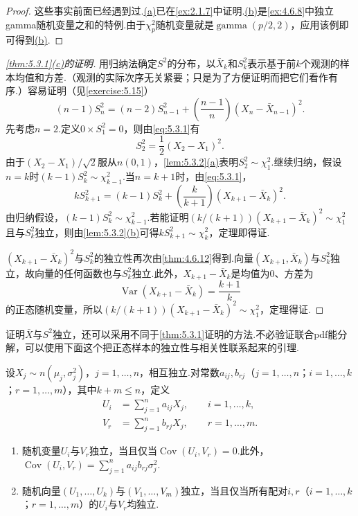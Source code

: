 \begin{proof}
这些事实前面已经遇到过.\hyperref[item:5.3.2a]{(a)}已在\autoref{ex:2.1.7}中证明.\hyperref[item:5.3.2b]{(b)}是\autoref{ex:4.6.8}中独立gamma随机变量之和的特例.由于$\chi_p^2$随机变量就是$\operatorname{gamma}(p/2,2)$，应用该例即可得到\hyperref[item:5.3.2b]{(b)}.
\end{proof}
\begin{proof}[{\autoref{thm:5.3.1}\hyperref[item:5.3.1c]{(c)}的证明}]
用归纳法确定$S^2$的分布，以$\bar X_k$和$S_k^2$表示基于前$k$个观测的样本均值和方差.（观测的实际次序无关紧要；只是为了方便证明而把它们看作有序.）容易证明（见\autoref{exercise:5.15}）
\begin{equation}\label{eq:5.3.1}
(n-1)S_n^2=(n-2)S_{n-1}^2+\left(\frac{n-1}{n}\right)(X_n-\bar X_{n-1})^2.
\end{equation}
先考虑$n=2$.定义$0\times S_1^2=0$，则由\eqref{eq:5.3.1}有
$$S_2^2=\frac12(X_2-X_1)^2.$$
由于$(X_2-X_1)/\sqrt2$服从$n(0,1)$，\autoref{lem:5.3.2}\hyperref[item:5.3.2a]{(a)}表明$S_2^2\sim\chi_1^2$.继续归纳，假设$n=k$时$(k-1)S_k^2\sim\chi_{k-1}^2$.当$n=k+1$时，由\eqref{eq:5.3.1}，
\begin{equation}\label{eq:5.3.2}
kS_{k+1}^2=(k-1)S_k^2+\left(\frac k{k+1}\right)(X_{k+1}-\bar X_k)^2.
\end{equation}
由归纳假设，$(k-1)S_k^2\sim\chi_{k-1}^2$.若能证明$(k/(k+1))(X_{k+1}-\bar X_k)^2\sim\chi_1^2$且与$S_k^2$独立，则由\autoref{lem:5.3.2}\hyperref[item:5.3.2b]{(b)}可得$kS_{k+1}^2\sim\chi_k^2$，定理即得证.

$(X_{k+1}-\bar X_k)^2$与$S_k^2$的独立性再次由\autoref{thm:4.6.12}得到.向量$(X_{k+1},\bar X_k)$与$S_k^2$独立，故向量的任何函数也与$S_k^2$独立.此外，$X_{k+1}-\bar X_k$是均值为0、方差为
$$\operatorname{Var}(X_{k+1}-\bar X_k)=\frac{k+1}{k}$$
的正态随机变量，所以$(k/(k+1))(X_{k+1}-\bar X_k)^2\sim\chi_1^2$，定理得证.
\end{proof}
证明$\bar X$与$S^2$独立，还可以采用不同于\autoref{thm:5.3.1}证明的方法.不必验证联合pdf能分解，可以使用下面这个把正态样本的独立性与相关性联系起来的引理.
\begin{lemma}\label{lem:5.3.3}
设$X_j\sim n(\mu_j,\sigma_j^2)$，$j=1,\ldots,n$，相互独立.对常数$a_{ij},b_{rj}$（$j=1,\ldots,n$；$i=1,\ldots,k$；$r=1,\ldots,m$），其中$k+m\le n$，定义
$$\begin{aligned}
U_i&=\sum_{j=1}^n a_{ij}X_j,\qquad i=1,\ldots,k,\\
V_r&=\sum_{j=1}^n b_{rj}X_j,\qquad r=1,\ldots,m.
\end{aligned}$$
\begin{enumerate}[label=\textbf{\alph*.}]
\item\label{item:5.3.3a} 随机变量$U_i$与$V_r$独立，当且仅当$\operatorname{Cov}(U_i,V_r)=0$.此外，$\operatorname{Cov}(U_i,V_r)=\sum_{j=1}^n a_{ij}b_{rj}\sigma_j^2$.
\item\label{item:5.3.3b} 随机向量$(U_1,\ldots,U_k)$与$(V_1,\ldots,V_m)$独立，当且仅当所有配对$i,r$（$i=1,\ldots,k$；$r=1,\ldots,m$）的$U_i$与$V_r$均独立.
\end{enumerate}
\end{lemma}
